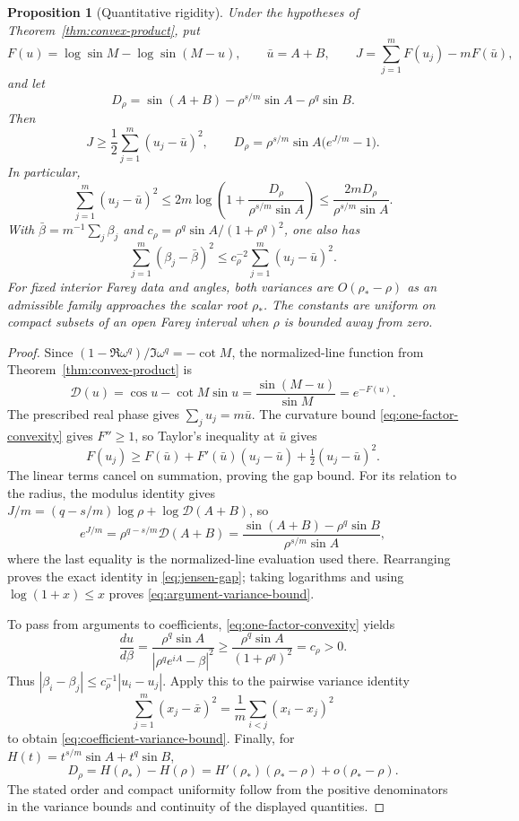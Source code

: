 \documentclass[11pt,a4paper]{article}
\newtheorem{proposition}[theorem]{Proposition}
\theoremstyle{definition}
\theoremstyle{remark}
\numberwithin{equation}{section}
\begin{document}
\begin{proposition}[Quantitative rigidity]\label{prop:quantitative-rigidity}
Under the hypotheses of Theorem~\ref{thm:convex-product}, put
\[
 F(u)=\log\sin M-\log\sin(M-u),\qquad
 \bar u=A+B,\qquad J=\sum_{j=1}^mF(u_j)-mF(\bar u),
\]
and let
\[
 D_\rho=\sin(A+B)-\rho^{s/m}\sin A-\rho^q\sin B.
\]
Then
\begin{equation}\label{eq:jensen-gap}
 J\ge\frac12\sum_{j=1}^m(u_j-\bar u)^2,
 \qquad
 D_\rho=\rho^{s/m}\sin A\bigl(e^{J/m}-1\bigr).
\end{equation}
In particular,
\begin{equation}\label{eq:argument-variance-bound}
 \sum_{j=1}^m(u_j-\bar u)^2
 \le2m\log\left(1+\frac{D_\rho}{\rho^{s/m}\sin A}\right)
 \le\frac{2mD_\rho}{\rho^{s/m}\sin A}.
\end{equation}
With $\bar\beta=m^{-1}\sum_j\beta_j$ and
$c_\rho=\rho^q\sin A/(1+\rho^q)^2$, one also has
\begin{equation}\label{eq:coefficient-variance-bound}
 \sum_{j=1}^m(\beta_j-\bar\beta)^2
 \le c_\rho^{-2}\sum_{j=1}^m(u_j-\bar u)^2.
\end{equation}
For fixed interior Farey data and angles, both variances are
$O(\rho_\ast-\rho)$ as an admissible family approaches the scalar root
$\rho_\ast$. The constants are uniform on compact subsets of an open Farey
interval when $\rho$ is bounded away from zero.
\end{proposition}
\begin{proof}
Since $(1-\Re\omega^q)/\Im\omega^q=-\cot M$, the normalized-line
function from Theorem~\ref{thm:convex-product} is
\[
 \mathcal D(u)=\cos u-\cot M\sin u
 =\frac{\sin(M-u)}{\sin M}=e^{-F(u)}.
\]
The prescribed real phase gives $\sum_j u_j=m\bar u$.
The curvature bound \eqref{eq:one-factor-convexity} gives $F''\ge1$,
so Taylor's inequality at $\bar u$ gives
\[
 F(u_j)\ge F(\bar u)+F'(\bar u)(u_j-\bar u)
                         +\tfrac12(u_j-\bar u)^2.
\]
The linear terms cancel on summation, proving the gap bound.
For its relation to the radius, the modulus identity gives
$J/m=(q-s/m)\log\rho+\log\mathcal D(A+B)$, so
\[
 e^{J/m}
 =\rho^{q-s/m}\mathcal D(A+B)
 =\frac{\sin(A+B)-\rho^q\sin B}{\rho^{s/m}\sin A},
\]
where the last equality is the normalized-line evaluation used there.
Rearranging proves the exact identity in \eqref{eq:jensen-gap}; taking
logarithms and using $\log(1+x)\le x$ proves
\eqref{eq:argument-variance-bound}.

To pass from arguments to coefficients, \eqref{eq:one-factor-convexity} yields
\[
 \frac{du}{d\beta}
 =\frac{\rho^q\sin A}{|\rho^qe^{iA}-\beta|^2}
 \ge\frac{\rho^q\sin A}{(1+\rho^q)^2}=c_\rho>0.
\]
Thus $|\beta_i-\beta_j|\le c_\rho^{-1}|u_i-u_j|$.
Apply this to the pairwise variance identity
\[
 \sum_{j=1}^m(x_j-\bar x)^2
       =\frac1m\sum_{i<j}(x_i-x_j)^2
\]
to obtain \eqref{eq:coefficient-variance-bound}.
Finally, for $H(t)=t^{s/m}\sin A+t^q\sin B$,
\[
 D_\rho=H(\rho_\ast)-H(\rho)
       =H'(\rho_\ast)(\rho_\ast-\rho)+o(\rho_\ast-\rho).
\]
The stated order and compact uniformity follow from the positive denominators
in the variance bounds and continuity of the displayed quantities.
\end{proof}
\end{document}

